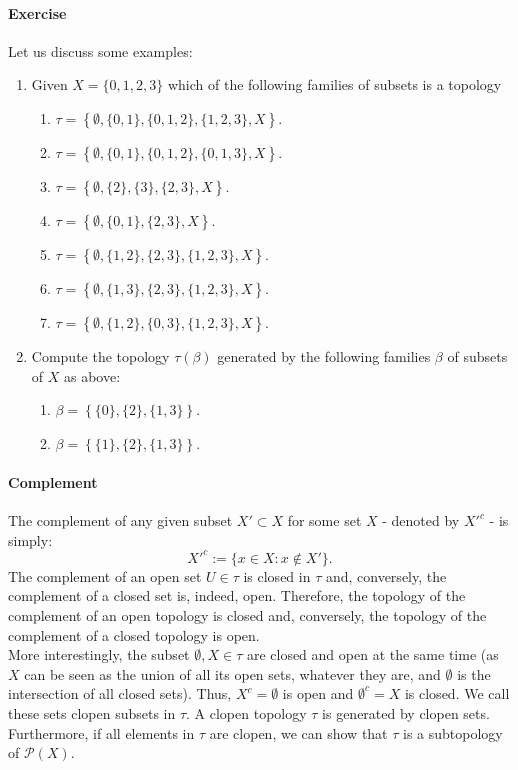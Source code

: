 \paragraph{Exercise} Let us discuss some examples:
\begin{enumerate}
\item Given $X = \{0, 1, 2, 3\}$ which of the following families of subsets is a topology
\begin{enumerate}
\item $\tau = \left\{\emptyset, \{0, 1\}, \{0, 1, 2\}, \{1, 2, 3\}, X\right\}$.
\item $\tau = \left\{\emptyset, \{0, 1\}, \{0, 1, 2\}, \{0, 1, 3\}, X\right\}$.
\item $\tau = \left\{\emptyset, \{2\}, \{3\}, \{2, 3\}, X\right\}$.
\item $\tau = \left\{\emptyset, \{0, 1\}, \{2, 3\}, X\right\}$.
\item $\tau = \left\{\emptyset, \{1, 2\}, \{2, 3\}, \{1, 2, 3\}, X\right\}$.
\item $\tau = \left\{\emptyset, \{1, 3\}, \{2, 3\}, \{1, 2, 3\}, X\right\}$.
\item $\tau = \left\{\emptyset, \{1, 2\}, \{0, 3\}, \{1, 2, 3\}, X\right\}$.
\end{enumerate}
\item Compute the topology $\tau(\beta)$ generated by the following families $\beta$ of subsets of $X$ as above:
\begin{enumerate}
\item $\beta = \left\{\{0\}, \{2\}, \{1, 3\}\right\}$.
\item $\beta = \left\{\{1\}, \{2\}, \{1, 3\}\right\}$.
\end{enumerate}
\end{enumerate}
\paragraph{Complement}
The complement of any given subset $X' \subset X$ for some set $X$ - denoted by $X'^{c}$ - is simply:
$$X'^c := \{x \in X : x \notin X'\}.$$
The complement of an open set $U \in \tau$ is closed in $\tau$ and, conversely, the complement of a closed set is, indeed, open. Therefore, the topology of the complement of an open topology is closed and, conversely, the topology of the complement of a closed topology is open.\\
\indent More interestingly, the subset $\emptyset, X \in \tau$ are closed and open at the same time (as $X$ can be seen as the union of all its open sets, whatever they are, and $\emptyset$ is the intersection of all closed sets). Thus, $X^c = \emptyset$ is open and $\emptyset^c = X$ is closed. We call these sets clopen subsets in $\tau$. A clopen topology $\tau$ is generated by clopen sets. Furthermore, if all elements in $\tau$ are clopen, we can show that $\tau$ is a subtopology of $\mathcal{P}(X)$.
